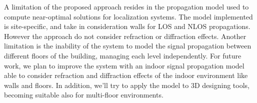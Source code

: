 A limitation of the proposed approach resides in the propagation model used to compute near-optimal solutions for localization systems. The model implemented is site-specific, and take in consideration walls for LOS and NLOS propagations. However the approach do not consider refraction or diffraction effects. Another limitation is the inability of the system to model the signal propagation between different floors of the building, managing each level independently.
For future work, we plan to improve the system with an indoor signal propagation model able to consider refraction and diffraction effects of the indoor environment like walls and floors. In addition, we'll try to apply the model to 3D designing tools, becoming suitable also for multi-floor environments.